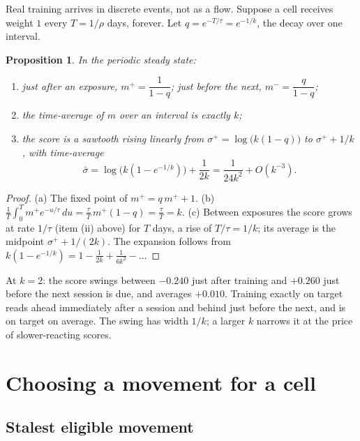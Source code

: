 \documentclass[11pt]{article}
\theoremstyle{plain}
\newtheorem{proposition}{Proposition}
\theoremstyle{definition}
\begin{document}
Real training arrives in discrete events, not as a flow. Suppose a cell
receives weight $1$ every $T = 1/\rho$ days, forever. Let
$q = e^{-T/\tau} = e^{-1/k}$, the decay over one interval.

\begin{proposition}\label{prop:sawtooth}
In the periodic steady state:
\begin{enumerate}[nosep,label=(\alph*)]
\item just after an exposure, $m^+ = \dfrac{1}{1-q}$; just before the
  next, $m^- = \dfrac{q}{1-q}$;
\item the time-average of $m$ over an interval is exactly $k$;
\item the score is a sawtooth rising linearly from
  $\sigma^+ = \log\bigl(k(1-q)\bigr)$ to $\sigma^+ + 1/k$, with
  time-average
  \[
  \bar\sigma = \log\bigl(k(1 - e^{-1/k})\bigr) + \frac{1}{2k}
  = \frac{1}{24k^2} + O(k^{-3}).
  \]
\end{enumerate}
\end{proposition}

\begin{proof}
(a) The fixed point of $m^+ = q\, m^+ + 1$. (b)
$\frac{1}{T}\int_0^T m^+ e^{-u/\tau}\,du = \frac{\tau}{T}\, m^+ (1 - q)
= \frac{\tau}{T} = k$. (c) Between exposures the score grows at rate
$1/\tau$ (item (ii) above) for $T$ days, a rise of $T/\tau = 1/k$; its
average is the midpoint $\sigma^+ + 1/(2k)$. The expansion follows from
$k(1 - e^{-1/k}) = 1 - \frac{1}{2k} + \frac{1}{6k^2} - \dots$
\end{proof}

At $k = 2$: the score swings between $-0.240$ just after training and
$+0.260$ just before the next session is due, and averages $+0.010$.
Training exactly on target reads ahead immediately after a session and
behind just before the next, and is on target on average. The swing has
width $1/k$; a larger $k$ narrows it at the price of slower-reacting
scores.

\section{Choosing a movement for a cell}\label{sec:choose}

\subsection{Stalest eligible movement}
\end{document}
